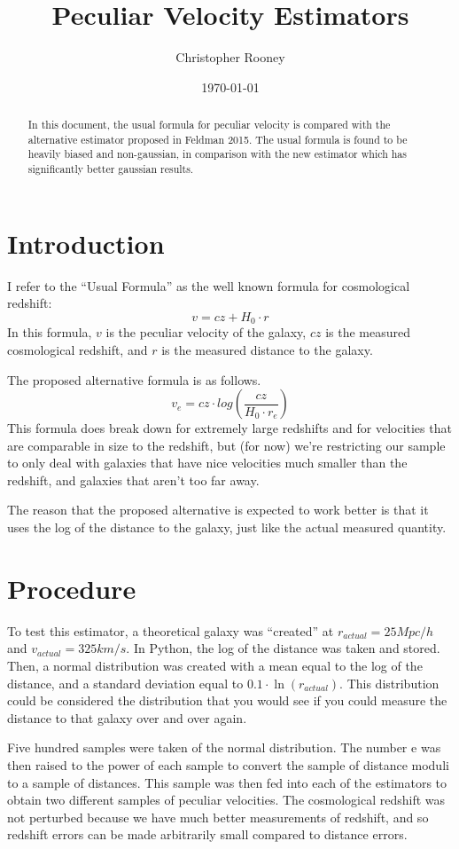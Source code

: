 \documentclass[usenatbib]{mn2e}
\newcommand{\e}{{\mathrm e}}
\begin{document}
\author{Christopher Rooney}
\date{\today}
\title{Peculiar Velocity Estimators}
\maketitle

\begin{abstract}
In this document, the usual formula for peculiar velocity is compared with the alternative estimator proposed in Feldman 2015. The usual formula is found to be heavily biased and non-gaussian, in comparison with the new estimator which has significantly better gaussian results.
\end{abstract}

\section{Introduction}
I refer to the ``Usual Formula'' as the well known formula for cosmological redshift:
\[
v = cz + H_0 \cdot r
\]
In this formula, $v$ is the peculiar velocity of the galaxy, $cz$ is the measured cosmological redshift, and $r$ is the measured distance to the galaxy. 

The proposed alternative formula is as follows.
\[
v_e = cz \cdot log \left( \frac{cz}{H_0 \cdot r_e} \right)
\]
This formula does break down for extremely large redshifts and for velocities that are comparable in size to the redshift, but (for now) we're restricting our sample to only deal with galaxies that have nice velocities much smaller than the redshift, and galaxies that aren't too far away.

The reason that the proposed alternative is expected to work better is that it uses the log of the distance to the galaxy, just like the actual measured quantity.

\section{Procedure}
To test this estimator, a theoretical galaxy was ``created'' at $r_{actual} = 25 Mpc/h$ and $v_{actual} = 325 km/s$. In Python, the log of the distance was taken and stored. Then, a normal distribution was created with a mean equal to the log of the distance, and a standard deviation equal to $0.1 \cdot \ln\left(r_{actual}\right)$. This distribution could be considered the distribution that you would see if you could measure the distance to that galaxy over and over again. 

Five hundred samples were taken of the normal distribution. The number $\e$ was then raised to the power of each sample to convert the sample of distance moduli to a sample of distances. This sample was then fed into each of the estimators to obtain two different samples of peculiar velocities. The cosmological redshift was not perturbed because we have much better measurements of redshift, and so redshift errors can be made arbitrarily small compared to distance errors.
\end{document}
